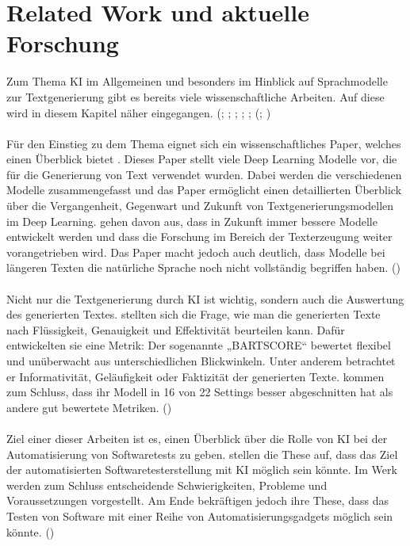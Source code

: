 \documentclass[12pt,toc=bib,toc=listof]{scrreprt}
\begin{document}
\chapter{Related Work und aktuelle Forschung} %
\label{sec:relatedWorkUndAktuelleForschung}
Zum Thema KI im Allgemeinen und besonders im Hinblick auf Sprachmodelle zur Textgenerierung gibt es bereits viele wissenschaftliche Arbeiten. Auf diese wird in diesem Kapitel näher eingegangen. (\cite{Iqbal2022}; \cite{Yuan2021}; \cite{Khan2024}; \cite{Bhandari2024}; \cite{Gu2024}; (\cite{Chen2024}; \cite{Wang2024})\\
\\
Für den Einstieg zu dem Thema eignet sich ein wissenschaftliches Paper, welches einen Überblick bietet \textcite{Iqbal2022}. Dieses Paper stellt viele Deep Learning Modelle vor, die für die Generierung von Text verwendet wurden. Dabei werden die verschiedenen Modelle zusammengefasst und das Paper ermöglicht einen detaillierten Überblick über die Vergangenheit, Gegenwart und Zukunft von Textgenerierungsmodellen im Deep Learning. \textcite{Iqbal2022} gehen davon aus, dass in Zukunft immer bessere Modelle entwickelt werden und dass die Forschung im Bereich der Texterzeugung weiter vorangetrieben wird. Das Paper macht jedoch auch deutlich, dass Modelle bei längeren Texten die natürliche Sprache noch nicht vollständig begriffen haben. (\cite{Iqbal2022})\\
\\
Nicht nur die Textgenerierung durch KI ist wichtig, sondern auch die Auswertung des generierten Textes. \textcite{Yuan2021} stellten sich die Frage, wie man die generierten Texte nach Flüssigkeit, Genauigkeit und Effektivität beurteilen kann. Dafür entwickelten sie eine Metrik: Der sogenannte „BARTSCORE“ bewertet flexibel und unüberwacht aus unterschiedlichen Blickwinkeln. Unter anderem betrachtet er Informativität, Geläufigkeit oder Faktizität der generierten Texte. \textcite{Yuan2021} kommen zum Schluss, dass ihr Modell in 16 von 22 Settings besser abgeschnitten hat als andere gut bewertete Metriken. (\cite{Yuan2021})\\
\\
Ziel einer dieser Arbeiten ist es, einen Überblick über die Rolle von KI bei der Automatisierung von Softwaretests zu geben. \textcite{Khan2024} stellen die These auf, dass das Ziel der automatisierten Softwaretesterstellung mit KI möglich sein könnte. Im Werk werden zum Schluss entscheidende Schwierigkeiten, Probleme und Voraussetzungen vorgestellt. Am Ende bekräftigen \textcite{Khan2024} jedoch ihre These, dass das Testen von Software mit einer Reihe von Automatisierungsgadgets möglich sein könnte. (\cite{Khan2024})\\
\end{document}
